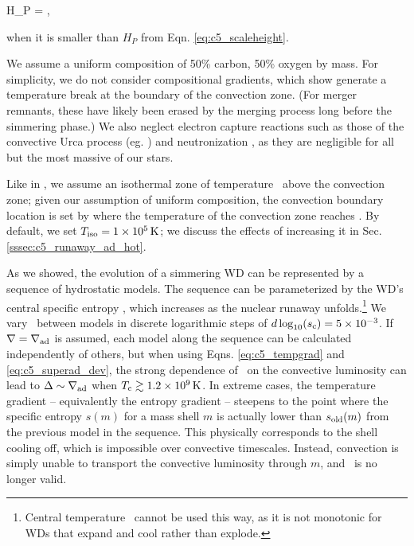 \eqbegin
H_P = ,
\eqend

\noindent when it is smaller than $H_P$ from Eqn. \ref{eq:c5_scaleheight}.

We assume a uniform composition of 50\% carbon, 50\% oxygen by mass.  For simplicity, we do not consider compositional gradients, which \citeal{piroc08} show generate a temperature break at the boundary of the convection zone.  (For merger remnants, these have likely been erased by the merging process long before the simmering phase.)  We also neglect electron capture reactions such as those of the convective Urca process (eg. \citealt{steiw06}) and neutronization \citep{pirob08}, as they are negligible for all but the most massive of our stars.  


Like in \citeal{piroc08}, we assume an isothermal zone of temperature \tempiso\ above the convection zone; given our assumption of uniform composition, the convection boundary location is set by where the temperature of the convection zone reaches \tempiso.  By default, we set $\tempiso = 1\times10^5\,\mrm{K}$; we discuss the effects of increasing it in Sec. \ref{sssec:c5_runaway_ad_hot}.

As we showed, the evolution of a simmering WD can be represented by a sequence of hydrostatic models.  The sequence can be parameterized by the WD's central specific entropy \Sc, which increases as the nuclear runaway unfolds.\footnote{Central temperature \Tc\ cannot be used this way, as it is not monotonic for WDs that expand and cool rather than explode.}  We vary \Sc\ between models in discrete logarithmic steps of $d\log_{10}(\Sc) = 5 \times 10^{-3}$.  If $\nabla = \nablaad$ is assumed, each model along the sequence can be calculated independently of others, but when using Eqns. \ref{eq:c5_tempgrad} and \ref{eq:c5_superad_dev}, the strong dependence of \vconv\ on the convective luminosity can lead to $\deltanab \sim \nablaad$ when $\Tc \gtrsim 1.2\times10^9\,\mrm{K}$.  In extreme cases, the temperature gradient -- equivalently the entropy gradient -- steepens to the point where the specific entropy $s(m)$ for a mass shell $m$ is actually lower than $s_\mathrm{old}(m)$ from the previous model in the sequence.  This physically corresponds to the shell cooling off, which is impossible over convective timescales.  Instead, convection is simply unable to transport the convective luminosity through $m$, and \deltanab\ is no longer valid.

